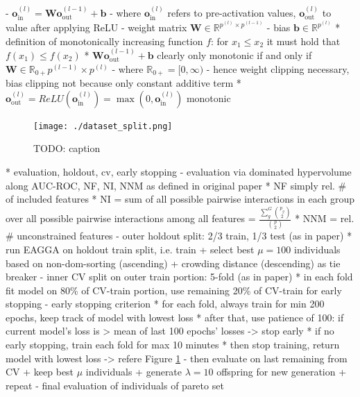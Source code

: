 \documentclass[twoside,11pt]{article}
\begin{document}
        - $\boldsymbol{o}_{\text{in}}^{(l)}=\boldsymbol{W} \boldsymbol{o}_{\text{out}}^{(l-1)} + \boldsymbol{b}$
        - where $\boldsymbol{o}_{\text{in}}^{(l)}$ refers to pre-activation values, $\boldsymbol{o}_{\text{out}}^{(l)}$ to value after applying ReLU
        - weight matrix $\boldsymbol{W}\in\mathbb{R}^{p^{(l)} \times p^{(l-1)}}$
        - bias $\boldsymbol{b}\in\mathbb{R}^{p^{(l)}}$
      * definition of monotonically increasing function $f$: for $x_1\le x_2$ it must hold that $f(x_1)\le f(x_2)$
      * $\boldsymbol{W} \boldsymbol{o}_{\text{out}}^{(l-1)} + \boldsymbol{b}$ clearly only monotonic if and only if $\boldsymbol{W}\in\mathbb{R}_{0+}{p^{(l-1)}\times p^{(l)}}$
        - where $\mathbb{R}_{0+}=[0,\infty)$
        - hence weight clipping necessary, bias clipping not because only constant additive term
      * $\boldsymbol{o}_{\text{out}}^{(l)}=ReLU(\boldsymbol{o}_{\text{in}}^{(l)})=\max(0,\boldsymbol{o}_{\text{in}}^{(l)})$ monotonic
\begin{figure}
  \centering
  \texttt{[image: ./dataset\_split.png]}
  \caption{TODO: caption}
  \label{fig-dataset-split}
\end{figure}
  * evaluation, holdout, cv, early stopping
    - evaluation via dominated hypervolume along AUC-ROC, NF, NI, NNM as defined in original paper
      * NF simply rel. \# of included features
      * NI = sum of all possible pairwise interactions in each group over all possible pairwise interactions among all features = $\frac{\sum_g^G {p_g \choose 2}}{{p \choose 2}}$
      * NNM = rel. \# unconstrained features
    - outer holdout split: 2/3 train, 1/3 test (as in paper)
      * run EAGGA on holdout train split, i.e. train + select best $\mu=100$ individuals based on non-dom-sorting (ascending) + crowding distance (descending) as tie breaker
    - inner CV split on outer train portion: 5-fold (as in paper)
      * in each fold fit model on 80\% of CV-train portion, use remaining 20\% of CV-train for early stopping
    - early stopping criterion
      * for each fold, always train for min 200 epochs, keep track of model with lowest loss
      * after that, use patience of 100: if current model's loss is > mean of last 100 epochs' losses -> stop early
      * if no early stopping, train each fold for max 10 minutes
      * then stop training, return model with lowest loss
    -> refere Figure \ref{fig-dataset-split}
    - then evaluate on last remaining from CV + keep best $\mu$ individuals + generate $\lambda=10$ offspring for new generation + repeat
    - final evaluation of individuals of pareto set
\end{document}
